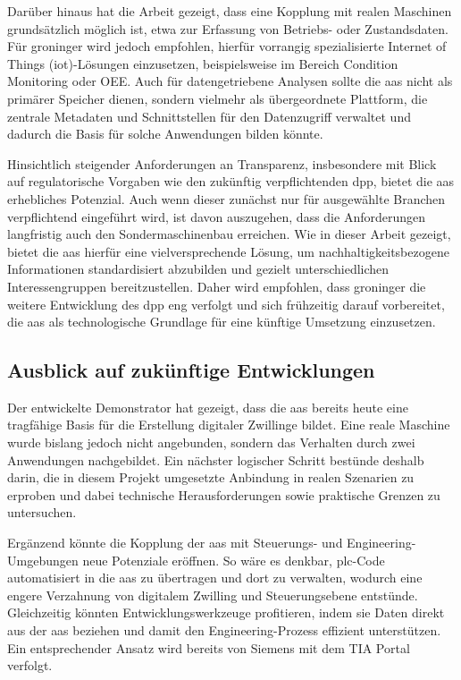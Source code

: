 Darüber hinaus hat die Arbeit gezeigt, dass eine Kopplung mit realen Maschinen grundsätzlich möglich ist, etwa zur Erfassung von Betriebs- oder Zustandsdaten. 
Für groninger wird jedoch empfohlen, hierfür vorrangig spezialisierte Internet of Things (\acs{iot})-Lösungen einzusetzen, beispielsweise im Bereich Condition Monitoring oder OEE.
Auch für datengetriebene Analysen sollte die \acs{aas} nicht als primärer Speicher dienen, sondern vielmehr als übergeordnete Plattform, die zentrale Metadaten und Schnittstellen für den Datenzugriff verwaltet und dadurch die Basis für solche Anwendungen bilden könnte.

Hinsichtlich steigender Anforderungen an Transparenz, insbesondere mit Blick auf regulatorische Vorgaben wie den zukünftig verpflichtenden \acs{dpp}, bietet die \acs{aas} erhebliches Potenzial. 
Auch wenn dieser zunächst nur für ausgewählte Branchen verpflichtend eingeführt wird, ist davon auszugehen, dass die Anforderungen langfristig auch den Sondermaschinenbau erreichen. 
Wie in dieser Arbeit gezeigt, bietet die \acs{aas} hierfür eine vielversprechende Lösung, um nachhaltigkeitsbezogene Informationen standardisiert abzubilden und gezielt unterschiedlichen Interessengruppen bereitzustellen. 
Daher wird empfohlen, dass 
\linebreak
groninger die weitere Entwicklung des \acs{dpp} eng verfolgt und sich frühzeitig darauf vorbereitet, die \acs{aas} als technologische Grundlage für eine künftige Umsetzung einzusetzen.

\subsection{Ausblick auf zukünftige Entwicklungen}
Der entwickelte Demonstrator hat gezeigt, dass die \acs{aas} bereits heute eine tragfähige Basis für die Erstellung digitaler Zwillinge bildet. 
Eine reale Maschine wurde bislang jedoch nicht angebunden, sondern das Verhalten durch zwei Anwendungen nachgebildet. 
Ein nächster logischer Schritt bestünde deshalb darin, die in diesem Projekt umgesetzte Anbindung in realen Szenarien zu erproben und dabei technische Herausforderungen sowie praktische Grenzen zu untersuchen. 

Ergänzend könnte die Kopplung der \acs{aas} mit Steuerungs- und Engineering-Umge\-bungen neue Potenziale eröffnen. 
So wäre es denkbar, \mbox{\ac{plc}}-Code automatisiert in die \acs{aas} zu übertragen und dort zu verwalten, wodurch eine engere Verzahnung von digitalem Zwilling und Steuerungsebene entstünde. 
Gleichzeitig könnten Entwicklungswerkzeuge profitieren, indem sie Daten direkt aus der \acs{aas} beziehen und damit den Engineering-Prozess effizient unterstützen. 
Ein entsprechender Ansatz wird bereits von Siemens mit dem TIA Portal verfolgt.

